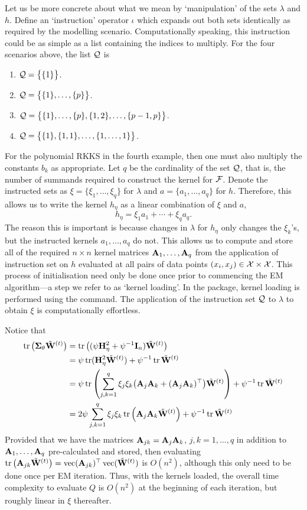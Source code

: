 Let us be more concrete about what we mean by `manipulation' of the sets $\lambda$ and $h$.
Define an `instruction' operator $\iota$ which expands out both sets identically as required by the modelling scenario.
Computationally speaking, this instruction could be as simple as a list containing the indices to multiply.
For the four scenarios above, the list ${\mathcal Q}$ is
\begin{enumerate}
  \item ${\mathcal Q} = \big\{ \{1\} \big\}$.
  \item ${\mathcal Q} = \big\{ \{1\},\dots,\{p\}\big\}$.
  \item  ${\mathcal Q} = \big\{ \{1\},\dots,\{p\},\{1,2\},\dots, \{p-1,p\}\big\}$.
  \item ${\mathcal Q} = \big\{ \{1\},\{1,1\},\dots, \{1,\dots,1\}\big\}$.
\end{enumerate}
For the polynomial RKKS in the fourth example, then one must also multiply the constants $b_k$ as appropriate.
Let $q$ be the cardinality of the set ${\mathcal Q}$, that is, the number of summands required to construct the kernel for ${\mathcal F}$.
Denote the instructed sets as $\xi = \{\xi_1,\dots,\xi_q \}$ for $\lambda$ and $a = \{a_1,\dots,a_q\}$ for $h$.
Therefore, this allows us to write the kernel $h_\eta$ as a linear combination of $\xi$ and $a$,
\[
  h_\eta = \xi_1a_1 + \cdots + \xi_qa_q.
\]
The reason this is important is because changes in $\lambda$ for $h_\eta$ only changes the $\xi_k$'s, but the instructed kernels $a_1,\dots,a_q$ do not.
This allows us to compute and store all of the required $n\times n$ kernel matrices ${\mathbf A}_1,\dots,{\mathbf A}_q$ from the application of instruction set on $h$ evaluated at all pairs of data points $(x_i,x_j)\in{\mathcal X}\times{\mathcal X}$.
This process of initialisation need only be done once prior to commencing the EM algorithm---a step we refer to as `kernel loading'.
In the  package, kernel loading is performed using the  command.
The application of the instruction set ${\mathcal Q}$ to $\lambda$ to obtain $\xi$ is computationally effortless.

Notice that
\begin{align*}
  \operatorname{tr}\big({\bm\Sigma}_\theta \tilde{\mathbf W}^{(t)}\big)
  &=  \operatorname{tr}\big( (\psi{\mathbf H}_\eta^2 + \psi^{-1}{\mathbf I}_n ) \tilde{\mathbf W}^{(t)} \big) \\
  &= \psi \operatorname{tr} ({\mathbf H}_\eta^2\tilde{\mathbf W}^{(t)}) + \psi^{-1}\operatorname{tr} \tilde{\mathbf W}^{(t)} \\
  &= \psi \operatorname{tr} \left(\sum_{j,k=1}^q \xi_j \xi_k \big({\mathbf A}_j {\mathbf A}_k + ({\mathbf A}_j {\mathbf A}_k)^\top\big)
   \tilde{\mathbf W}^{(t)}\right) + \psi^{-1}\operatorname{tr} \tilde{\mathbf W}^{(t)} \\
   &= 2\psi \sum_{j,k=1}^q \xi_j \xi_k \operatorname{tr} \left(  {\mathbf A}_j {\mathbf A}_k 
   \tilde{\mathbf W}^{(t)}\right) + \psi^{-1}\operatorname{tr} \tilde{\mathbf W}^{(t)}
\end{align*}
Provided that we have the matrices ${\mathbf A}_{jk} = {\mathbf A}_j{\mathbf A}_k$, $j,k=1,\dots,q$ in addition to ${\mathbf A}_1,\dots,{\mathbf A}_q$ pre-calculated and stored, then evaluating $\operatorname{tr}\big({\mathbf A}_{jk} \tilde{\mathbf W}^{(t)} \big) = \operatorname{vec}({\mathbf A}_{jk})^\top \operatorname{vec}(\tilde{\mathbf W}^{(t)} )$ is $O(n^2)$, although this  only need to be done once per EM iteration.
Thus, with the kernels loaded, the overall time complexity to evaluate $Q$ is $O(n^2)$ at the beginning of each iteration, but roughly linear in $\xi$ thereafter.

